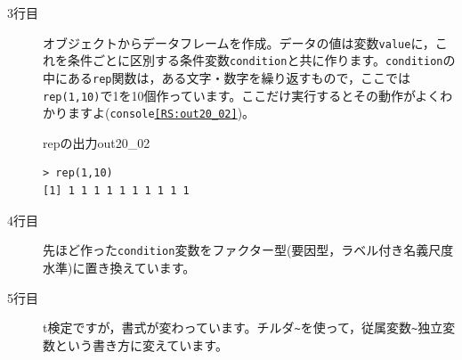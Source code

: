 \begin{description}
	\item[3行目] オブジェクトからデータフレームを作成。データの値は変数\texttt{value}に，これを条件ごとに区別する条件変数\texttt{condition}と共に作ります。\texttt{condition}の中にある\texttt{rep}関数は，ある文字・数字を繰り返すもので，ここでは\texttt{rep(1,10)}で1を10個作っています。ここだけ実行するとその動作がよくわかりますよ(\texttt{console\ref{RS:out20_02}})。
	      \begin{Rscreen}{repの出力}{out20_02}
		      \begin{verbatim}
> rep(1,10)
[1] 1 1 1 1 1 1 1 1 1 1
    \end{verbatim}
	      \end{Rscreen}
	\item[4行目] 先ほど作った\texttt{condition}変数をファクター型(要因型，ラベル付き名義尺度水準)に置き換えています。
	\item[5行目] t検定ですが，書式が変わっています。チルダ\texttt{\~}を使って，従属変数\verb|~|独立変数という書き方に変えています。
\end{description}
